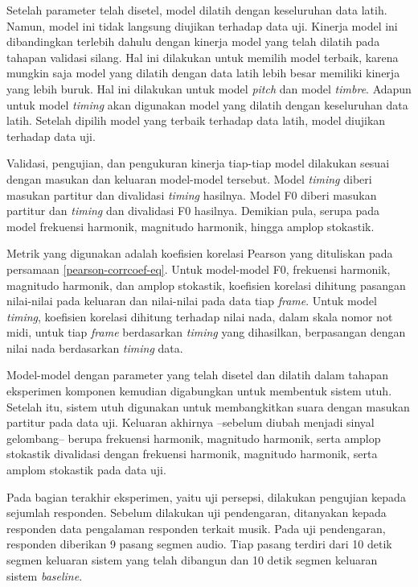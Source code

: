 Setelah parameter telah disetel, model dilatih dengan keseluruhan data latih. Namun, model ini tidak langsung diujikan terhadap data uji. Kinerja model ini dibandingkan terlebih dahulu dengan kinerja model yang telah dilatih pada tahapan validasi silang. Hal ini dilakukan untuk memilih model terbaik, karena mungkin saja model yang dilatih dengan data latih lebih besar memiliki kinerja yang lebih buruk. Hal ini dilakukan untuk model \textit{pitch} dan model \textit{timbre}. Adapun untuk model \textit{timing} akan digunakan model yang dilatih dengan keseluruhan data latih. Setelah dipilih model yang terbaik terhadap data latih, model diujikan terhadap data uji.

Validasi, pengujian, dan pengukuran kinerja tiap-tiap model dilakukan sesuai dengan masukan dan keluaran model-model tersebut. Model \textit{timing} diberi masukan partitur dan divalidasi \textit{timing} hasilnya. Model F0 diberi masukan partitur dan \textit{timing} dan divalidasi F0 hasilnya. Demikian pula, serupa pada model frekuensi harmonik, magnitudo harmonik, hingga amplop stokastik.

Metrik yang digunakan adalah koefisien korelasi Pearson yang dituliskan pada persamaan \ref{pearson-corrcoef-eq}. Untuk model-model F0, frekuensi harmonik, magnitudo harmonik, dan amplop stokastik, koefisien korelasi dihitung pasangan nilai-nilai pada keluaran dan nilai-nilai pada data tiap \textit{frame}. Untuk model \textit{timing}, koefisien korelasi dihitung terhadap nilai nada, dalam skala nomor not midi, untuk tiap \textit{frame} berdasarkan \textit{timing} yang dihasilkan, berpasangan dengan nilai nada berdasarkan \textit{timing} data.

Model-model dengan parameter yang telah disetel dan dilatih dalam tahapan eksperimen komponen kemudian digabungkan untuk membentuk sistem utuh. Setelah itu, sistem utuh digunakan untuk membangkitkan suara dengan masukan partitur pada data uji. Keluaran akhirnya --sebelum diubah menjadi sinyal gelombang-- berupa frekuensi harmonik, magnitudo harmonik, serta amplop stokastik divalidasi dengan frekuensi harmonik, magnitudo harmonik, serta amplom stokastik pada data uji.

Pada bagian terakhir eksperimen, yaitu uji persepsi, dilakukan pengujian kepada sejumlah responden. Sebelum dilakukan uji pendengaran, ditanyakan kepada responden data pengalaman responden terkait musik. Pada uji pendengaran, responden diberikan 9 pasang segmen audio. Tiap pasang terdiri dari 10 detik segmen keluaran sistem yang telah dibangun dan 10 detik segmen keluaran sistem \textit{baseline}.

